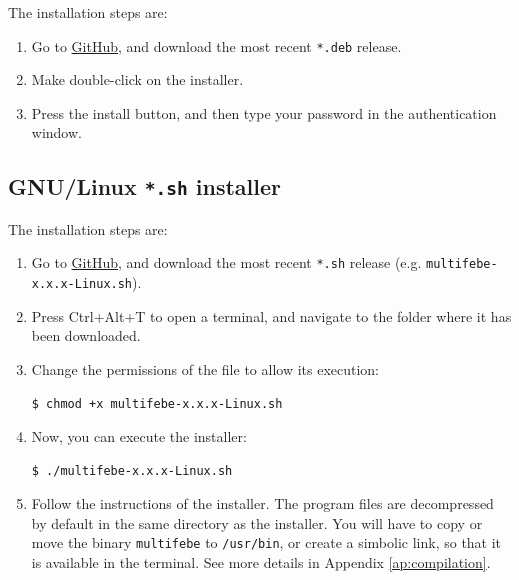 \documentclass[a4paper,fleqn]{book}
\begin{document}
\label{subsec:deb}

The installation steps are:
\begin{enumerate}
    \item Go to \href{https://github.com/mmc-siani-es/MultiFEBE/releases}{GitHub}, and download the most recent \texttt{*.deb} release.
    \item Make double-click on the installer.
    \item Press the install button, and then type your password in the authentication window.   
\end{enumerate}

\subsection{GNU/Linux \texttt{*.sh} installer}

The installation steps are:
\begin{enumerate}
    \item Go to \href{https://github.com/mmc-siani-es/MultiFEBE/releases}{GitHub}, and download the most recent \texttt{*.sh} release (e.g. \texttt{multifebe-x.x.x-Linux.sh}).
    \item Press Ctrl+Alt+T to open a terminal, and navigate to the folder where it has been downloaded.
    \item Change the permissions of the file to allow its execution:
\begin{Verbatim}[frame=single, fontsize=\small]
$ chmod +x multifebe-x.x.x-Linux.sh
\end{Verbatim}
    \item Now, you can execute the installer:
\begin{Verbatim}[frame=single, fontsize=\small]
$ ./multifebe-x.x.x-Linux.sh
\end{Verbatim}
    \item Follow the instructions of the installer. The program files are decompressed by default in the same directory as the installer. You will have to copy or move the binary \texttt{multifebe} to \texttt{/usr/bin}, or create a simbolic link, so that it is available in the terminal. See more details in Appendix \ref{ap:compilation}.
\end{enumerate}
\end{document}
